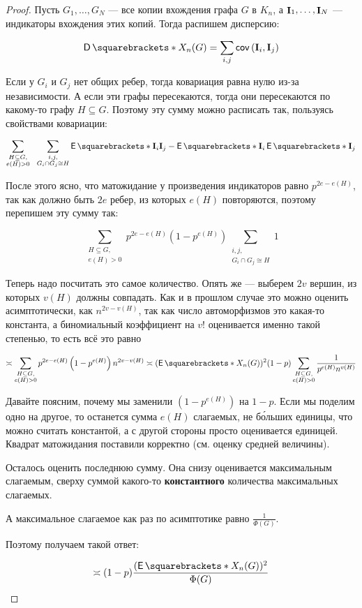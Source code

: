 \begin{proof}
  Пусть $G_1, \ldots, G_N$ --- все копии вхождения графа $G$ в $K_n$, а
  $\mathop{\mathbf{I}}_1, \ldots, \mathop{\mathbf{I}}_N$ --- индикаторы вхождения этих копий. Тогда распишем дисперсию:

  \[
    \D{X_n(G)} = \sum\limits_{i, j} \cov{(\mathbf{I}_i, \mathbf{I}_j)}
  \]

  Если у $G_i$ и $G_j$ нет общих ребер, тогда ковариация равна нулю из-за независимости.
  А если эти графы пересекаются, тогда они пересекаются по какому-то графу $H
  \subseteq G$. Поэтому эту сумму можно расписать так, пользуясь свойствами ковариации:

  \[
    \sum\limits_{\substack{H \subseteq G,\\e(H) > 0}} \ \ \sum\limits_{\substack{i, j,\\G_i \cap G_j \cong H}}
    \E{\mathbf{I}_i \mathbf{I}_j} - \E{\mathbf{I}_i}\E{\mathbf{I}_j}
  \]

  После этого ясно, что матожидание у произведения индикаторов равно $p^{2e
  - e(H)}$, так как должно быть $2e$ ребер, из которых $e(H)$ повторяются,
  поэтому перепишем эту сумму так:

  \[
    \sum\limits_{\substack{H \subseteq G,\\e(H) > 0}} 
    p^{2e - e(H)}\left(1 - p^{e(H)}\right)\sum\limits_{\substack{i, j,\\G_i \cap G_j \cong H}} 1
  \]

  Теперь надо посчитать это самое количество. Опять же --- 
  выберем $2v$ вершин, из которых $v(H)$ должны совпадать. Как и в прошлом 
  случае это можно оценить асимптотически, как $n^{2v - v(H)}$, так как 
  число автоморфизмов это какая-то константа, а биномиальный коэффициент на 
  $v!$ оценивается именно такой степенью, то есть всё это равно

  \[
    \asymp \sum\limits_{\substack{H \subseteq G,\\e(H) > 0}} 
    p^{2e - e(H)}\left(1 - p^{e(H)}\right) n^{2v - v(H)} \asymp
    (\E{X_n(G)})^2 (1 - p) \sum\limits_{\substack{H \subseteq G,\\e(H) > 0}} 
    \frac{1}{p^{e(H)}n^{v(H)}}
  \]

  Давайте поясним, почему мы заменили $(1 - p^{e(H)})$ на $1 - p$.
  Если мы поделим одно на другое, то останется сумма $e(H)$ слагаемых, не б\'{о}льших
  единицы, что можно считать константой, а с другой стороны просто оценивается
  единицей. Квадрат матожидания поставили корректно (см. оценку средней величины).

  Осталось оценить последнюю сумму. Она снизу оценивается максимальным слагаемым,
  сверху суммой какого-то \textbf{константного} количества максимальных слагаемых.

  А максимальное слагаемое как раз по асимптотике равно $\frac{1}{\Phi(G)}$.

  Поэтому получаем такой ответ:

  \[
    \asymp (1 - p)\dfrac{(\E{X_n(G)})^2}{\Phi(G)}
  \]
\end{proof}


